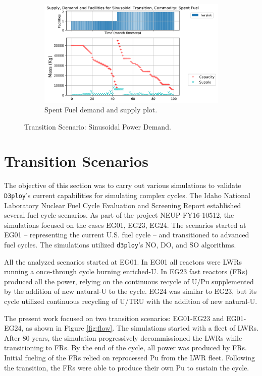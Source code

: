 \documentclass[11pt,letterpaper]{article}
\begin{document}
\begin{figure}[!htbp]
\begin{subfigure}[t]{0.45\textwidth}
    \end{subfigure}
    \hfill
    \begin{subfigure}[t]{0.45\textwidth}
        \centering
        \includegraphics[width=\linewidth]{figures/sinetransition-spentfuel.png} 
        \caption{Spent Fuel demand and supply plot.}
        \label{fig:sinetransition-spentfuel}
    \end{subfigure}
    \caption{Transition Scenario: Sinusoidal Power Demand.}
\end{figure}

\pagebreak
\section{Transition Scenarios}

The objective of this section was to carry out various simulations to validate 
\texttt{D3ploy}'s current capabilities for simulating complex cycles.
The Idaho National Laboratory Nuclear Fuel Cycle Evaluation and Screening Report \cite{wigeland_nuclear_2014} established several fuel cycle scenarios.
As part of the project NEUP-FY16-10512, the simulations focused on the cases EG01, EG23, EG24. The scenarios started at EG01 -- representing the current U.S. fuel cycle -- and transitioned to advanced fuel cycles.
The simulations utilized \texttt{d3ploy}'s NO, DO, and SO algorithms.

All the analyzed scenarios started at EG01. In EG01 all reactors were LWRs running a  once-through cycle burning enriched-U.
In EG23 fast reactors (FRs) produced all the power, relying on the continuous recycle of U/Pu supplemented by the addition of new natural-U to the cycle.
EG24 was similar to EG23, but its cycle utilized continuous recycling of U/TRU with the addition of new natural-U.

The present work focused on two transition scenarios: EG01-EG23 and EG01-EG24,  as shown in Figure \ref{fig:flow}. The simulations started with a fleet of LWRs. After 80 years, the simulation progressively decommissioned the LWRs while transitioning to FRs. By the end of the cycle, all power was produced by FRs. Initial fueling of the FRs relied on  reprocessed Pu from the LWR fleet. Following the transition, the FRs were able to produce their own Pu to sustain the cycle.
\end{document}
